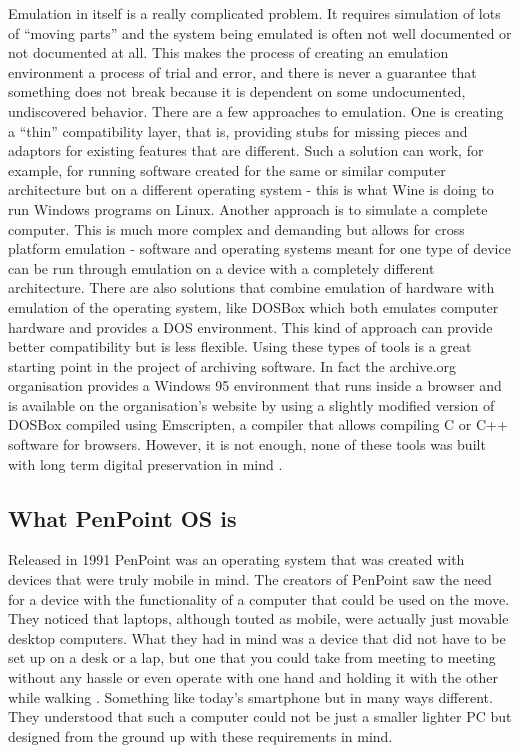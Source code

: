 Emulation in itself is a really complicated problem. It requires simulation of
lots of ``moving parts'' and the system being emulated is often not well
documented or not documented at all. This makes the process of creating an
emulation environment a process of trial and error, and there is never
a guarantee that something does not break because it is dependent on some
undocumented, undiscovered behavior. There are a few approaches to emulation.
One is creating a ``thin'' compatibility layer, that is, providing stubs for
missing pieces and adaptors for existing features that are different. Such
a solution can work, for example, for running software created for the same or
similar computer architecture but on a different operating system - this is what
Wine is doing to run Windows programs on Linux. Another approach is to simulate
a complete computer. This is much more complex and demanding but allows for
cross platform emulation - software and operating systems meant for one type of
device can be run through emulation on a device with a completely different
architecture. There are also solutions that combine emulation of hardware with
emulation of the operating system, like DOSBox which both emulates computer
hardware and provides a DOS environment. This kind of approach can provide
better compatibility but is less flexible. Using these types of tools is
a great starting point in the project of archiving software. In fact the
archive.org organisation provides a Windows 95 environment that runs inside
a browser and is available on the organisation's website \cite{win95web} by
using a slightly modified version of DOSBox compiled using Emscripten,
a compiler that allows compiling C or C++ software for browsers. However, it is
not enough, none of these tools was built with long term digital preservation
in mind \cite{hoeven2007}.

\subsection{What PenPoint OS is}

Released in 1991 PenPoint was an operating system that was created with devices
that were truly mobile in mind. The creators of PenPoint saw the need for
a device with the functionality of a computer that could be used on the move.
They noticed that laptops, although touted as mobile, were actually just
movable desktop computers. What they had in mind was a device that did not have
to be set up on a desk or a lap, but one that you could take from meeting to meeting
\cite{startupadv} without any hassle or even operate with one hand and holding
it with the other while walking \cite{carr1991}. Something like today's
smartphone but in many ways different. They understood that such a computer
could not be just a smaller lighter PC but designed from the ground up with
these requirements in mind.

